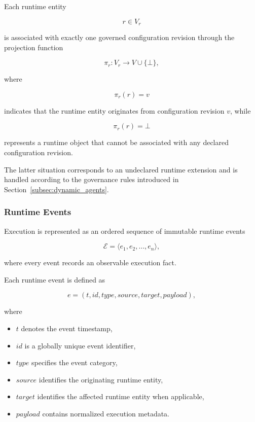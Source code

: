 \documentclass[10pt]{article}
\begin{document}
Each runtime entity

\[
r\in V_r
\]

is associated with exactly one governed configuration revision through the
projection function

\begin{equation}
\pi_r :
V_r
\rightarrow
V \cup \{\bot\},
\label{eq:app_runtime_graph}
\end{equation}

where

\[
\pi_r(r)=v
\]

indicates that the runtime entity originates from configuration revision
$v$, while

\[
\pi_r(r)=\bot
\]

represents a runtime object that cannot be associated with any declared
configuration revision.

The latter situation corresponds to an undeclared runtime extension and is
handled according to the governance rules introduced in
Section~\ref{subsec:dynamic_agents}.

\subsubsection{Runtime Events}

Execution is represented as an ordered sequence of immutable runtime events

\begin{equation}
\mathcal{E}
=
\langle
e_1,
e_2,
\dots,
e_n
\rangle,
\label{eq:app_runtime_even1}
\end{equation}

where every event records an observable execution fact.

Each runtime event is defined as

\begin{equation}
e=
(
t,
id,
type,
source,
target,
payload
),
\label{eq:app_runtime_even2}
\end{equation}

where

\begin{itemize}
	\item $t$ denotes the event timestamp,
	\item $id$ is a globally unique event identifier,
	\item $type$ specifies the event category,
	\item $source$ identifies the originating runtime entity,
	\item $target$ identifies the affected runtime entity when applicable,
	\item $payload$ contains normalized execution metadata.
\end{itemize}
\end{document}
